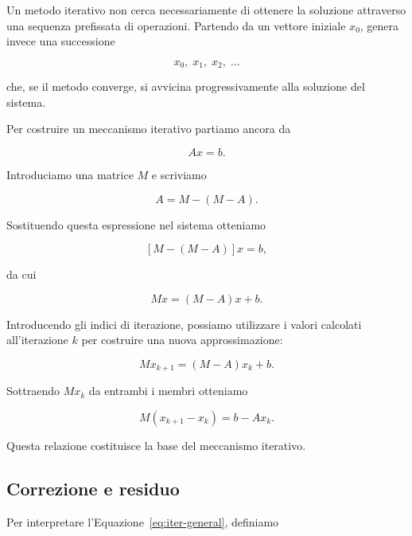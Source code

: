 Un metodo iterativo non cerca necessariamente di ottenere la
soluzione attraverso una sequenza prefissata di operazioni.
Partendo da un vettore iniziale $x_0$, genera invece una successione

\begin{equation*}
    x_0,\;x_1,\;x_2,\;\ldots
\end{equation*}

che, se il metodo converge, si avvicina progressivamente alla
soluzione del sistema.

Per costruire un meccanismo iterativo partiamo ancora da

\begin{equation*}
    Ax=b.
    \label{eq:iter-system}
\end{equation*}

Introduciamo una matrice $M$ e scriviamo

\begin{equation*}
    A=M-(M-A).
\end{equation*}

Sostituendo questa espressione nel sistema otteniamo

\begin{equation*}
    \left[M-(M-A)\right]x=b,
\end{equation*}

da cui

\begin{equation*}
    Mx=(M-A)x+b.
\end{equation*}

Introducendo gli indici di iterazione, possiamo utilizzare i valori
calcolati all'iterazione $k$ per costruire una nuova approssimazione:

\begin{equation*}
    Mx_{k+1}=(M-A)x_k+b.
\end{equation*}

Sottraendo $Mx_k$ da entrambi i membri otteniamo

\begin{equation}
    M(x_{k+1}-x_k)=b-Ax_k.
    \label{eq:iter-general}
\end{equation}

Questa relazione costituisce la base del meccanismo iterativo.


\subsection{Correzione e residuo}

Per interpretare l'Equazione~\eqref{eq:iter-general}, definiamo


